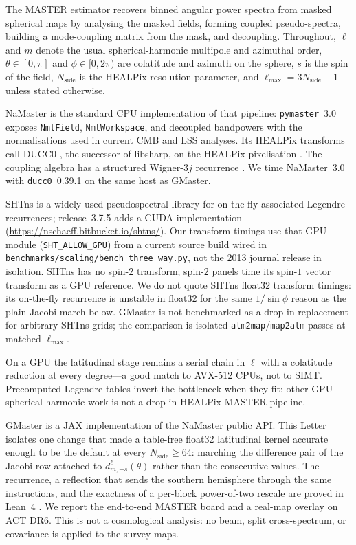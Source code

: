\documentclass[letters,usenatbib,useAMS]{mnras}
\begin{document}
The MASTER estimator \citep{hivon2002} recovers binned angular power spectra from masked spherical maps by analysing the masked fields, forming coupled pseudo-spectra, building a mode-coupling matrix from the mask, and decoupling. Throughout, $\ell$ and $m$ denote the usual spherical-harmonic multipole and azimuthal order, $\theta\in[0,\pi]$ and $\phi\in[0,2\pi)$ are colatitude and azimuth on the sphere, $s$ is the spin of the field, $N_{\mathrm{side}}$ is the HEALPix resolution parameter, and $\ell_{\max}=3N_{\mathrm{side}}-1$ unless stated otherwise.

NaMaster \citep{alonso2019} is the standard CPU implementation of that pipeline: \texttt{pymaster}~3.0 exposes \texttt{NmtField}, \texttt{NmtWorkspace}, and decoupled bandpowers with the normalisations used in current CMB and LSS analyses. Its HEALPix transforms call DUCC0 \citep{reinecke2013}, the successor of libsharp, on the HEALPix pixelisation \citep{gorski2005}. The coupling algebra has a structured Wigner-$3j$ recurrence \citep{kiddier2026}. We time NaMaster~3.0 with \texttt{ducc0}~0.39.1 on the same host as GMaster.

SHTns \citep{schaeffer2013} is a widely used pseudospectral library for on-the-fly associated-Legendre recurrences; release~3.7.5 adds a CUDA implementation (\url{https://nschaeff.bitbucket.io/shtns/}). Our transform timings use that GPU module (\texttt{SHT\_ALLOW\_GPU}) from a current source build wired in \texttt{benchmarks/scaling/bench\_three\_way.py}, not the 2013 journal release in isolation. SHTns has no spin-$2$ transform; spin-$2$ panels time its spin-$1$ vector transform as a GPU reference. We do not quote SHTns float32 transform timings: its on-the-fly recurrence is unstable in float32 for the same $1/\sin\phi$ reason as the plain Jacobi march below. GMaster is not benchmarked as a drop-in replacement for arbitrary SHTns grids; the comparison is isolated \texttt{alm2map}/\texttt{map2alm} passes at matched $\ell_{\max}$.

On a GPU the latitudinal stage remains a serial chain in $\ell$ with a colatitude reduction at every degree---a good match to AVX-512 CPUs, not to SIMT. Precomputed Legendre tables \citep{price2024} invert the bottleneck when they fit; other GPU spherical-harmonic work \citep{belkner2024,reinecke2023} is not a drop-in HEALPix MASTER pipeline.

GMaster is a JAX implementation of the NaMaster public API. This Letter isolates one change that made a table-free float32 latitudinal kernel accurate enough to be the default at every $N_{\mathrm{side}}\ge64$: marching the difference pair of the Jacobi row attached to $d^\ell_{m,-s}(\theta)$ rather than the consecutive values. The recurrence, a reflection that sends the southern hemisphere through the same instructions, and the exactness of a per-block power-of-two rescale are proved in Lean~4 \citep{demoura2021,mathlib2020}. We report the end-to-end MASTER board and a real-map overlay on ACT DR6. This is not a cosmological analysis: no beam, split cross-spectrum, or covariance is applied to the survey maps.
\end{document}
